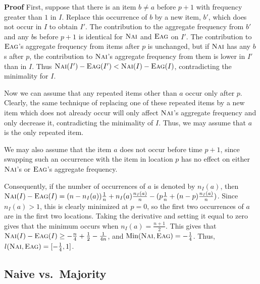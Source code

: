 \documentclass[11pt]{article}
\newenvironment{proof}{\begin{trivlist}\item[]{\bf Proof }}{\hspace*{\fill}\raisebox{-1pt}{\boldmath$\Box$}\end{trivlist}}
\newcommand{\nav}{{\ensuremath{\textsc{Nai}}}\xspace}
\newcommand{\eag}{{\ensuremath{\textsc{Eag}}}\xspace}
\DeclareMathOperator{\Min}{\textrm{Min}}
\begin{document}
\begin{proof}
First, suppose that there is an
item $b\not= a$ before $p+1$ with frequency greater than $1$ in $I$.
Replace this occurrence of $b$ by a new item, $b'$, which does not occur
in $I$ to obtain $I'$. The contribution to the aggregate frequency
from $b'$ and any $b$s before $p+1$ is identical for \nav and \eag on $I'$.
The contribution to \eag's aggregate frequency from items after $p$ is
unchanged, but if \nav has any $b$s after $p$, the contribution to \nav's
aggregate frequency from them is lower in $I'$ than in $I$. Thus
$\nav(I')-\eag(I') < \nav(I) - \eag(I)$, contradicting the minimality
for $I$.

Now we can assume that any repeated items other than $a$ occur only after $p$.
Clearly, the same technique of replacing one of these repeated
items by a new item which does not already occur will only affect \nav's
aggregate frequency and only decrease it, contradicting the minimality
of $I$. Thus, we may assume that $a$ is the only repeated item.

We may also assume that the item $a$ does not occur before
time $p+1$, since swapping such an occurrence with the item in
location $p$ has no effect on either \nav's or \eag's aggregate frequency.

Consequently, if the number of occurrences of $a$ is denoted by $n_I(a)$,
then $\nav(I)-\eag(I) = (n-n_I(a))\frac{1}{n} + n_I(a)\frac{n_I(a)}{n} -
(p\frac{1}{n} + (n-p)\frac{n_I(a)}{n})$. Since $n_I(a)>1$, this is
clearly minimized at $p=0$, so the first two occurrences of $a$ are
in the first two locations. Taking the derivative and setting it equal
to zero gives that the minimum occurs when $n_I(a)=\frac{n+1}{2}$. This
gives that $\nav(I)-\eag(I) \geq -\frac{n}{4} +\frac{1}{2}-\frac{1}{4n}$,
and  $\Min(\nav, \eag)=-\frac{1}{4}$.
Thus, $l(\nav, \eag) = [-\frac{1}{4}, 1]$.
\end{proof}

\subsection{Naive vs.\ Majority}
\end{document}
